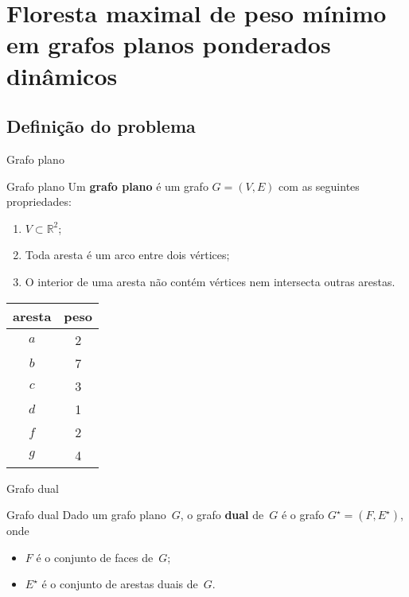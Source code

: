 \documentclass{IFES-beamer}
\newcommand{\R}{\mathbb{R}}
\newcommand{\defi}[1]{\textbf{#1}} %
\begin{document}
\section[MSF]{Floresta maximal de peso mínimo\\ em grafos planos ponderados dinâmicos}

\subsection{Definição do problema}
\begin{frame}{Grafo plano}
\begin{block}{Grafo plano}
Um \defi{grafo plano} é um grafo $G = (V, E)$ com as seguintes propriedades:
\begin{enumerate}
\item $V\subset \R^2$;
\item Toda aresta é um arco entre dois vértices;
\item O interior de uma aresta não contém vértices nem intersecta outras arestas.
\end{enumerate}
\end{block}
\begin{minipage}[H]{0.4\textwidth}
\begin{tabular}{| c | c |} 
 \hline
 aresta & peso\\
 \hline
 $a$ & 2 \\ 
 \hline
$b$ & 7 \\
 \hline
$c$ & 3 \\
 \hline
$d$ & 1 \\
 \hline
$f$ & 2 \\
 \hline
$g$ & 4 \\
 \hline
\end{tabular}
\end{minipage}
\begin{minipage}[H]{0.4\textwidth}
\begin{figure}[H]
\scalebox{1}{

	}
\end{figure}
\end{minipage}

\end{frame}




\begin{frame}{Grafo dual}
\begin{block}{Grafo dual}
Dado um grafo plano~$G$, o grafo \defi{dual} de~$G$ é o grafo $G^\star = (F,E^\star)$, onde
\begin{itemize}
\item $F$ é o conjunto de faces de~$G$;
\item $E^\star$ é o conjunto de arestas duais de~$G$.
\end{itemize}
\end{block}
\begin{figure}[H]
\scalebox{1.2}{
\centering

}
\label{fig:MSF-basico-1}
\end{figure}
\end{frame}
\end{document}
